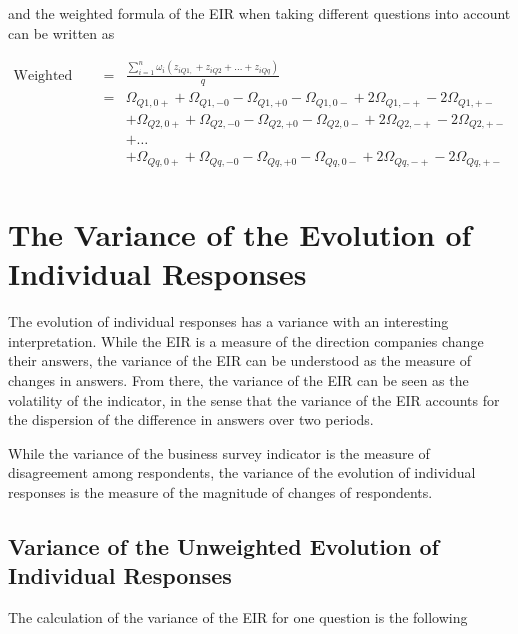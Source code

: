 \documentclass[12pt,a4paper,oneside]{book}
\begin{document}
and the weighted formula of the EIR when taking different questions into account can be written as

\begin{eqnarray}
    \mbox{Weighted EIR}\ &=& \frac{ \sum_{i=1}^n \omega_i \left(z_{i Q1,} + z_{i Q2} + \ldots + z_{i Qq} \right)}{q} \nonumber \\
&=&    \Omega_{Q1,0+} + \Omega_{Q1,-0} - \Omega_{Q1,+0} - \Omega_{Q1,0-} +2 \Omega_{Q1,-+} -2\Omega_{Q1,+-} \nonumber \\
&&    + \Omega_{Q2,0+} + \Omega_{Q2,-0} - \Omega_{Q2,+0} - \Omega_{Q2,0-} +2 \Omega_{Q2,-+} -2\Omega_{Q2,+-} \nonumber \\
&&	 + \ldots \nonumber \\
&&   + \Omega_{Qq,0+} + \Omega_{Qq,-0} - \Omega_{Qq,+0} - \Omega_{Qq,0-} +2 \Omega_{Qq,-+} -2\Omega_{Qq,+-} \nonumber \\
\end{eqnarray}




\chapter{The Variance of the Evolution of Individual Responses} \label{Chapter:Var Z}

The evolution of individual responses has a variance with an interesting interpretation.
While the EIR is a measure of the direction companies change their answers, the variance of the EIR can be understood as the measure of changes in answers.
From there, the variance of the EIR can be seen as the volatility of the indicator, in the sense that the variance of the EIR accounts for the dispersion of the difference in answers over two periods.

While the variance of the business survey indicator is the measure of disagreement among respondents, the variance of the evolution of individual responses is the measure of the magnitude of changes of respondents.


\section{Variance of the Unweighted Evolution of Individual Responses}

The calculation of the variance of the EIR for one question is the following
\end{document}
